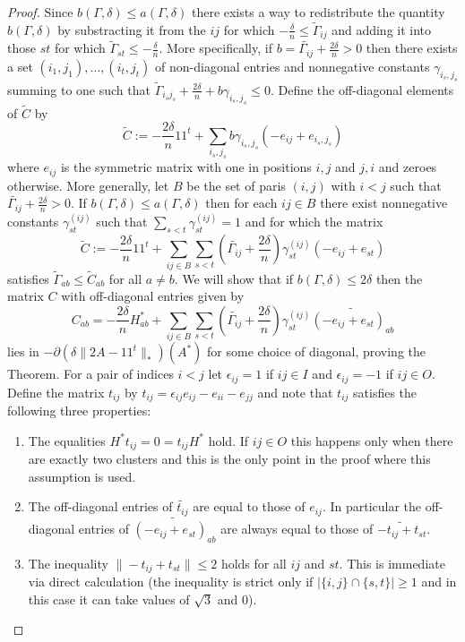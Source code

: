\documentclass[12pt]{amsart}
\theoremstyle{remark}
\begin{document}
\begin{proof}
Since $b(\Gamma,\delta)\leq a(\Gamma,\delta)$ there exists a way to redistribute the quantity $b(\Gamma,\delta)$ by substracting it from the $ij$ for which $-\frac{\delta}{n}\leq \widetilde{\Gamma}_{ij}$  and adding it into those $st$ for which $\widetilde{\Gamma}_{st}\leq -\frac{\delta}{n}$. More specifically, if $b=\widetilde{\Gamma_{ij}}+\frac{2\delta}{n}>0$ then there exists a set $(i_1,j_1),\dots, (i_t,j_t)$ of non-diagonal entries and nonnegative constants $\gamma_{i_s,j_s}$ summing to one 
such that $\widetilde{\Gamma}_{i_sj_s}+\frac{2\delta}{n}+ b\gamma_{i_s,j_s}\leq 0$. Define the off-diagonal elements of $\widetilde{C}$ by
\[\widetilde{C}:=-\frac{2\delta}{n} 11^t + \sum_{i_s,j_s} b\gamma_{i_s,j_s}(-e_{ij}+e_{i_s,j_s})\]
where $e_{ij}$ is the symmetric matrix with one in positions $i,j$ and $j,i$ and zeroes otherwise. More generally, let $B$ be the set of paris $(i,j)$ with $i<j$ such that $\widetilde{\Gamma_{ij}}+\frac{2\delta}{n}>0$. If $b(\Gamma,\delta)\leq a(\Gamma,\delta)$ then for each $ij\in B$ there exist nonnegative constants $\gamma^{(ij)}_{st}$ such that $\sum_{s < t} \gamma^{(ij)}_{st}=1$ and for which the matrix
\[\widetilde{C}:=-\frac{2\delta}{n}11^t+\sum_{ij\in B} \sum_{s<t} \left(\widetilde{\Gamma_{ij}}+\frac{2\delta}{n}\right)\gamma_{st}^{(ij)} (-e_{ij}+e_{st})\]  
satisfies $\widetilde{\Gamma}_{ab}\leq \widetilde{C}_{ab}$ for all $a\neq b$. We will show that if $b(\Gamma,\delta)\leq 2\delta$ then the matrix $C$ with off-diagonal entries given by
\[C_{ab}=-\frac{2\delta}{n}H^*_{ab} + \sum_{ij\in B} \sum_{s<t} \left(\widetilde{\Gamma_{ij}}+\frac{2\delta}{n}\right)\gamma_{st}^{(ij)} \widetilde{(-e_{ij}+e_{st})_{ab}}\]
lies in $-\partial \left(\delta\|2A-11^t\|_*\right)(A^*)$ for some choice of diagonal, proving the Theorem. 
For a pair of indices $i<j$ let $\epsilon_{ij}=1$ if $ij\in I$ and $\epsilon_{ij}=-1$ if $ij\in O$. Define the matrix $t_{ij}$ by $t_{ij}=\epsilon_{ij} e_{ij}-e_{ii}-e_{jj}$ and note that $t_{ij}$ satisfies the following three properties: 
\begin{enumerate}
\item The equalities $H^*t_{ij}=0=t_{ij}H^*$ hold. If $ij\in O$ this happens only when there are exactly two clusters and this is the only point in the proof where this assumption is used.
\item The off-diagonal entries of $\widetilde{t_{ij}}$ are equal to those of $e_{ij}$. In particular the off-diagonal entries of $\widetilde{(-e_{ij}+e_{st})_{ab}}$ are always equal to those of $\widetilde{-t_{ij}+t_{st}}$.
\item The inequality $\|-t_{ij}+t_{st}\|\leq 2$ holds for all $ij$ and $st$. This is immediate via direct calculation (the inequality is strict only if $|\{i,j\}\cap\{s,t\}|\geq 1$ and in this case it can take values of $\sqrt{3}$ and $0$).  

\end{enumerate}
\end{proof}
\end{document}
